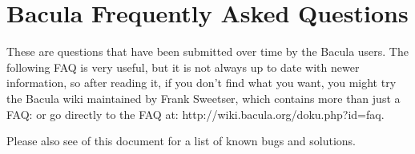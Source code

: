
\chapter{Bacula Frequently Asked Questions}
\label{FaqChapter}

These are questions that have been submitted over time by the
Bacula users. The following
FAQ is very useful, but it is not always up to date 
with newer information, so after reading it, if you don't find what you 
want, you might try the Bacula wiki maintained by Frank Sweetser, which
contains more than just a FAQ:
or go directly to the FAQ at: 
{http://wiki.bacula.org/doku.php?id=faq}.

Please also see
 of this document for a list
of known bugs and solutions.

